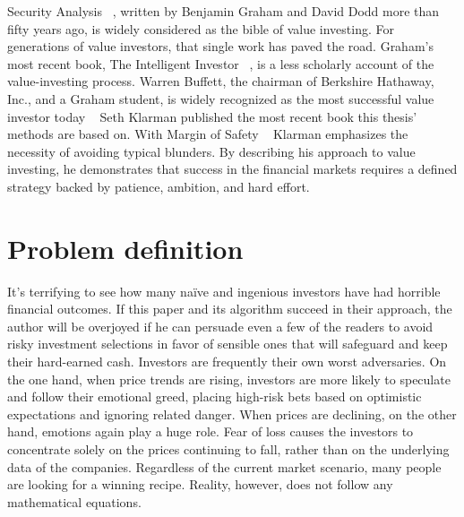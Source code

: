 \documentclass{imc-inf}
\begin{document}
Security Analysis ~\cite{security_analysis}, written by Benjamin Graham and David Dodd more than fifty years ago, is widely considered as the bible of value investing. For generations of value investors, that single work has paved the road. Graham's most recent book, The Intelligent Investor ~\cite{the_intelligent_investor}, is a less scholarly account of the value-investing process. Warren Buffett, the chairman of Berkshire Hathaway, Inc., and a Graham student, is widely recognized as the most successful value investor today ~\cite{margin_of_safety} Seth Klarman published the most recent book this thesis’ methods are based on. With Margin of Safety ~\cite{margin_of_safety} Klarman emphasizes the necessity of avoiding typical blunders. By describing his approach to value investing, he demonstrates that success in the financial markets requires a defined strategy backed by patience, ambition, and hard effort.

\chapter{Problem definition}\label{chap:problem defintion}
It's terrifying to see how many naïve and ingenious investors have had horrible financial outcomes. If this paper and its algorithm succeed in their approach, the author will be overjoyed if he can persuade even a few of the readers to avoid risky investment selections in favor of sensible ones that will safeguard and keep their hard-earned cash.
Investors are frequently their own worst adversaries. On the one hand, when price trends are rising, investors are more likely to speculate and follow their emotional greed, placing high-risk bets based on optimistic expectations and ignoring related danger. When prices are declining, on the other hand, emotions again play a huge role. Fear of loss causes the investors to concentrate solely on the prices continuing to fall, rather than on the underlying data of the companies. Regardless of the current market scenario, many people are looking for a winning recipe. Reality, however, does not follow any mathematical equations.
\end{document}
